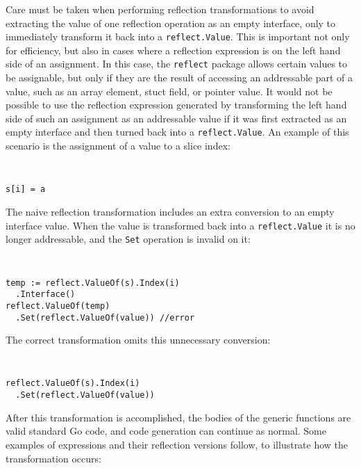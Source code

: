 \documentclass[letterpaper,twocolumn,11pt]{article}
\begin{document}
Care must be taken when performing reflection transformations to avoid extracting the value of one reflection operation as an empty interface, only to immediately transform it back into a \texttt{reflect.Value}. This is important not only for efficiency, but also in cases where a reflection expression is on the left hand side of an assignment. In this case, the \texttt{reflect} package allows certain values to be assignable, but only if they are the result of accessing an addressable part of a value, such as an array element, stuct field, or pointer value. It would not be possible to use the reflection expression generated by transforming the left hand side of such an assignment as an addressable value if it was first extracted as an empty interface and then turned back into a \texttt{reflect.Value}. An example of this scenario is the assignment of a value to a slice index:
{ \tt \small
\begin{verbatim}
s[i] = a
\end{verbatim}
}
The naive reflection transformation includes an extra conversion to an empty interface value. When the value is transformed back into a \texttt{reflect.Value} it is no longer addressable, and the \texttt{Set} operation is invalid on it:
{ \tt \small
\begin{verbatim}
temp := reflect.ValueOf(s).Index(i)
  .Interface()
reflect.ValueOf(temp)
  .Set(reflect.ValueOf(value)) //error
\end{verbatim}
}
The correct transformation omits this unnecessary conversion:
{ \tt \small
\begin{verbatim}
reflect.ValueOf(s).Index(i)
  .Set(reflect.ValueOf(value))
\end{verbatim}
}

After this transformation is accomplished, the bodies of the generic functions are valid standard Go code, and code generation can continue as normal. Some examples of expressions and their reflection versions follow, to illustrate how the transformation occurs:
\end{document}
